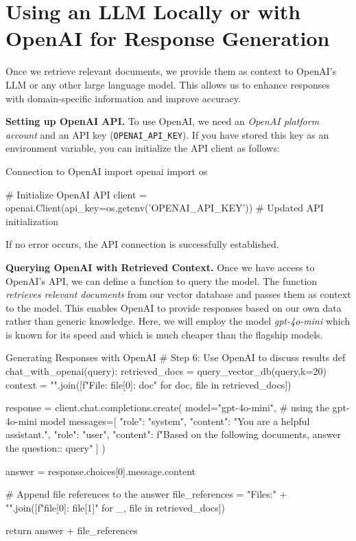 %
\section{Using an LLM Locally or with OpenAI for Response Generation}

Once we retrieve relevant documents, we provide them as context to OpenAI’s LLM or any other large language model. 
This allows us to enhance responses with domain-specific information and improve accuracy.

\textbf{Setting up OpenAI API.} To use OpenAI, we need an \emph{OpenAI platform account} and an API key (\texttt{OPENAI\_API\_KEY}). 
If you have stored this key as an environment variable, you can initialize the API client as follows:

\begin{codeonly}{Connection to OpenAI}
import openai
import os

# Initialize OpenAI API
client = openai.Client(api_key=os.getenv('OPENAI_API_KEY'))  # Updated API initialization
\end{codeonly}

If no error occurs, the API connection is successfully established.

\textbf{Querying OpenAI with Retrieved Context.} Once we have access to OpenAI's API, we can define a function to query the model.
The function \emph{retrieves relevant documents} from our vector database and passes them as context to the model.
This enables OpenAI to provide responses based on our own data rather than generic knowledge. Here, we will employ the model {\em gpt-4o-mini} which is known for its speed and which is much cheaper than the flagship models. 

\begin{codeonly}{Generating Responses with OpenAI}
# Step 6: Use OpenAI to discuss results
def chat_with_openai(query):
    retrieved_docs = query_vector_db(query,k=20)
    context = "\n\n".join([f"File: {file[0]}\nContent: {doc}" for doc, file in retrieved_docs])
    
    response = client.chat.completions.create(
        model="gpt-4o-mini",  # using the gpt-4o-mini model
        messages=[
            {"role": "system", "content": "You are a helpful assistant."},
            {"role": "user", "content": f"Based on the following documents, answer the question:\n\nQuestion: {query}"}
        ]
    )
    
    answer = response.choices[0].message.content
    
    # Append file references to the answer
    file_references = "\n\nReferenced Files:\n" + "\n".join([f"{file[0]}: {file[1]}" for _, file in retrieved_docs])
    
    return answer + file_references
\end{codeonly}

